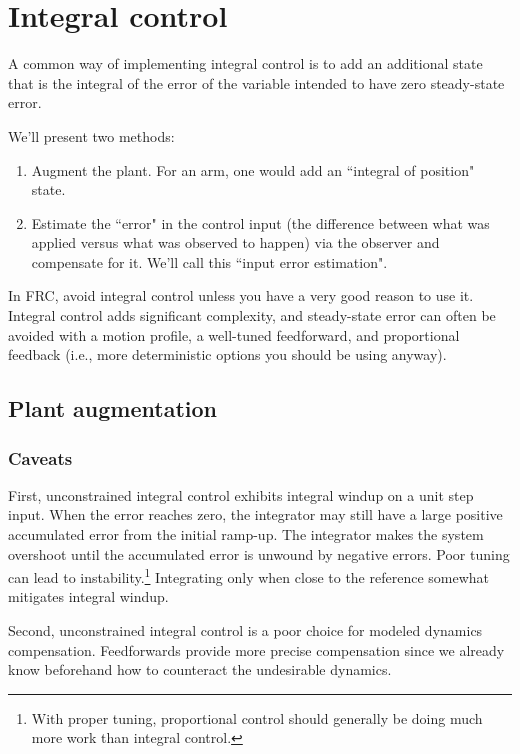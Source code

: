 \section{Integral control}
\label{sec:integral_control}

A common way of implementing integral control is to add an additional
\gls{state} that is the integral of the \gls{error} of the variable intended to
have zero \gls{steady-state error}.

We'll present two methods:
\begin{enumerate}
  \item Augment the \gls{plant}. For an arm, one would add an ``integral of
    position" state.
  \item Estimate the ``error" in the \gls{control input} (the difference between
    what was applied versus what was observed to happen) via the \gls{observer}
    and compensate for it. We'll call this ``input error estimation".
\end{enumerate}

In FRC, avoid integral control unless you have a very good reason to use it.
Integral control adds significant complexity, and steady-state error can often
be avoided with a motion profile, a well-tuned feedforward, and proportional
feedback (i.e., more deterministic options you should be using anyway).

\subsection{Plant augmentation}

\subsubsection{Caveats}

First, unconstrained integral control exhibits integral windup on a unit
\gls{step input}. When the error reaches zero, the integrator may still have a
large positive accumulated error from the initial ramp-up. The integrator makes
the system overshoot until the accumulated error is unwound by negative errors.
Poor tuning can lead to instability.\footnote{With proper tuning, proportional
control should generally be doing much more work than integral control.}
Integrating only when close to the \gls{reference} somewhat mitigates integral
windup.

Second, unconstrained integral control is a poor choice for modeled dynamics
compensation. Feedforwards provide more precise compensation since we already
know beforehand how to counteract the undesirable dynamics.

